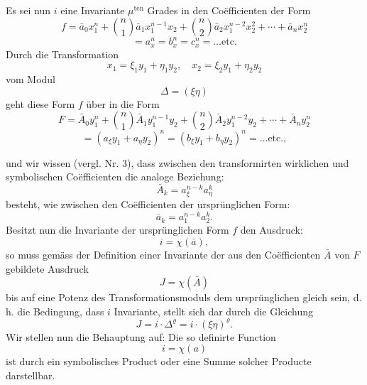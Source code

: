 \documentclass[11pt]{article}
\providecommand{\weberpage}[1]{}
\providecommand{\weq}[2]{\begin{equation}\tag{#1}#2\end{equation}}
\let\Delta\varDelta
\begin{document}
Es sei nun $i$ eine Invariante $\mu^{\text{ten}}$ Grades in den Co\"efficienten der
Form
\[
f = \bar{a}_0x_1^n + \binom{n}{1}\bar{a}_1x_1^{n-1}x_2 + \binom{n}{2}\bar{a}_2x_1^{n-2}x_2^2 + \cdots + \bar{a}_nx_2^n
\]
\[
= a_x^n = b_x^n = c_x^n = \ldots \text{etc.}
\]
Durch die Transformation
\[
x_1 = \xi_1y_1 + \eta_1y_2, \quad x_2 = \xi_2y_1 + \eta_2y_2
\]
vom Modul
\[
\Delta = (\xi\eta)
\]
geht diese Form $f$ über in die Form
\[
F = \bar{A}_0y_1^n + \binom{n}{1}\bar{A}_1y_1^{n-1}y_2 + \binom{n}{2}\bar{A}_2y_1^{n-2}y_2 + \cdots + \bar{A}_ny_2^n
\]
\[
= (a_\xi y_1 + a_\eta y_2)^n = (b_\xi y_1 + b_\eta y_2)^n = \ldots \text{etc.},
\]


\weberpage{111}
und wir wissen (vergl. Nr. 3), dass zwischen den transformirten wirklichen
 und symbolischen Co\"efficienten die analoge Beziehung:
\[
\bar{A}_k = a_\xi^{n-k}a_\eta^k
\]
besteht, wie zwischen den Co\"efficienten der ursprünglichen Form:
\[
\bar{a}_k = a_1^{n-k}a_2^k.
\]
Besitzt nun die Invariante der ursprünglichen Form $f$ den Ausdruck:
\[
i = \chi(\bar{a}),
\]
so muss gemäss der Definition einer Invariante der aus den Co\"efficienten
 $\bar{A}$ von $F$ gebildete Ausdruck
\[
J = \chi(\bar{A})
\]
bis auf eine Potenz des Transformationsmoduls dem ursprünglichen
gleich sein, d. h. die Bedingung, dass $i$ Invariante, stellt sich dar
durch die Gleichung
\weq{I}{J = i\cdot\Delta^\varrho = i\cdot(\xi\eta)^\varrho.}
Wir stellen nun die Behauptung auf: \glqq Die so definirte Function
\[
i = \chi(a)
\]
ist durch ein symbolisches Product oder eine Summe solcher Producte
darstellbar.\grqq{}
\end{document}
